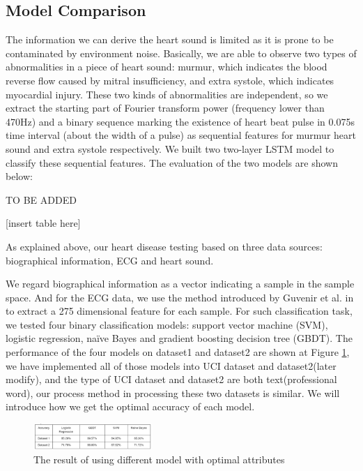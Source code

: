 \documentclass[letterpaper]{article} %
\begin{document}
\subsection{Model Comparison}

The information we can derive the heart sound is limited as it is prone to be contaminated by environment noise. Basically, we are able to observe two types of abnormalities in a piece of heart sound: murmur, which indicates the blood reverse flow caused by mitral insufficiency, and extra systole, which indicates myocardial injury. These two kinds of abnormalities are independent, so we extract the starting part of Fourier transform power (frequency lower than 470Hz) and a binary sequence marking the existence of heart beat pulse in 0.075s time interval (about the width of a pulse) as sequential features for murmur heart sound and extra systole respectively. We built two two-layer LSTM model to classify these sequential features. The evaluation of the two models are shown below:

TO BE ADDED

[insert table here]

As explained above, our heart disease testing based on three data sources: biographical information, ECG and heart sound.

We regard biographical information as a vector indicating a sample in the sample space. And for the ECG data, we use the method introduced by Guvenir et al. in \cite{ECG} to extract a 275 dimensional feature for each sample.  For such classification task, we tested four binary classification models: support vector machine (SVM), logistic regression, naïve Bayes and gradient boosting decision tree (GBDT). 
The performance of the four models on dataset1 and dataset2 are shown at Figure \ref{fig:dataset-1-comparison}, we have implemented all of those models into UCI dataset and dataset2(later modify), and the type of UCI dataset and dataset2 are both text(professional word), our process method in processing these two datasets is similar. We will introduce how we get the optimal accuracy of each model.

\begin{figure}[!htbp]
\centering\includegraphics[width=0.4\textwidth]{dataset-1-comparison}
\caption{The result of using different model with optimal attributes}
\label{fig:dataset-1-comparison}
\end{figure}
\end{document}
